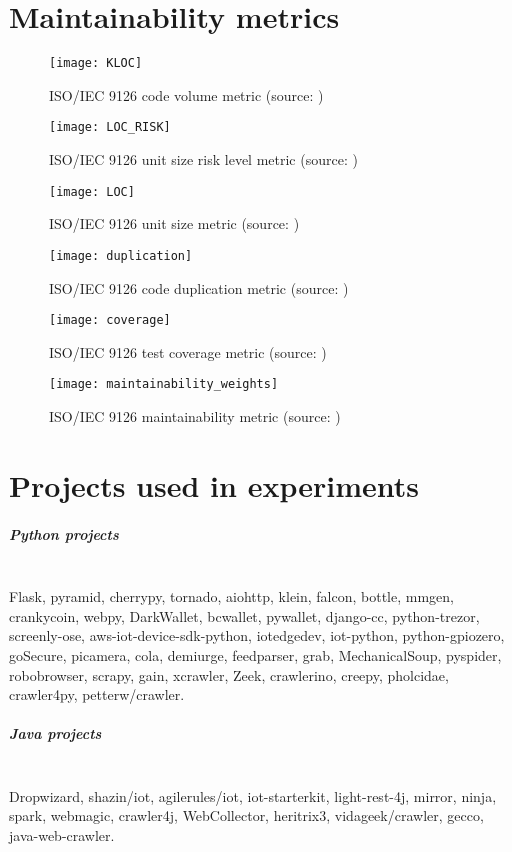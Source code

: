 \documentclass[twoside]{uva-inf-bachelor-thesis}
\newcommand{\myparagraph}[1]{\paragraph{#1}\mbox{}\\}
\begin{document}



\begin{appendices}
\chapter{Maintainability metrics}
\label{appendix:maintainability_metrics}

\begin{figure}[H]
    \caption{ISO/IEC 9126 code volume metric (source: \cite{heitlager2016practical})}
    \centering
        \texttt{[image: KLOC]}
\end{figure}

\begin{figure}[H]
    \caption{ISO/IEC 9126 unit size risk level metric (source: \cite{heitlager2016practical})}
    \centering
        \texttt{[image: LOC\_RISK]}
\end{figure}

\begin{figure}[H]
    \caption{ISO/IEC 9126 unit size metric (source: \cite{heitlager2016practical})}
    \centering
        \texttt{[image: LOC]}
\end{figure}

\begin{figure}[H]
    \caption{ISO/IEC 9126 code duplication metric (source: \cite{heitlager2016practical})}
    \centering
        \texttt{[image: duplication]}
\end{figure}

\begin{figure}[H]
    \caption{ISO/IEC 9126 test coverage metric (source: \cite{heitlager2016practical})}
    \centering
        \texttt{[image: coverage]}
\end{figure}

\begin{figure}[H]
    \label{figure:maintainability_weights}
    \caption{ISO/IEC 9126 maintainability metric (source: \cite{heitlager2016practical})}
    \centering
        \texttt{[image: maintainability\_weights]}
\end{figure}

\chapter{Projects used in experiments}
\label{appendix:projects}
\myparagraph{Python projects}
Flask, pyramid, cherrypy, tornado, aiohttp, klein, falcon, bottle, mmgen, crankycoin, webpy, DarkWallet, bcwallet, pywallet, django-cc, python-trezor, screenly-ose, aws-iot-device-sdk-python, iotedgedev, iot-python, python-gpiozero, goSecure, picamera, cola, demiurge, feedparser, grab, MechanicalSoup, pyspider, robobrowser, scrapy, gain, xcrawler, Zeek, crawlerino, creepy, pholcidae, crawler4py, petterw/crawler.

\myparagraph{Java projects}
Dropwizard, shazin/iot, agilerules/iot, iot-starterkit, light-rest-4j, mirror, ninja, spark, webmagic, crawler4j, WebCollector, heritrix3, vidageek/crawler, gecco, java-web-crawler.

\end{appendices}
\end{document}
